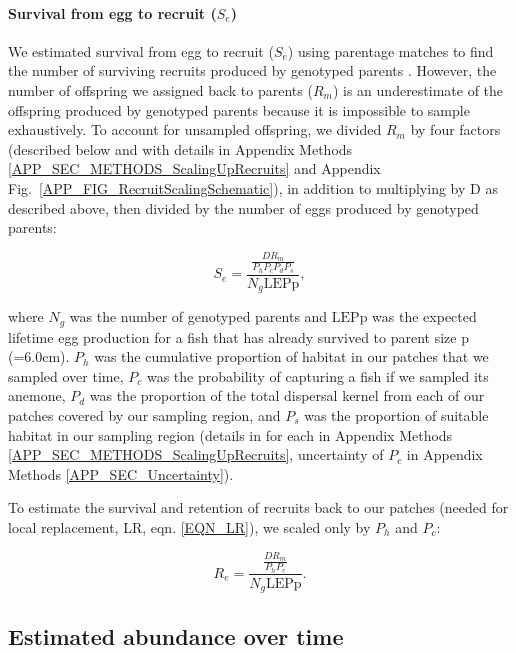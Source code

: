 \documentclass[12pt, oneside]{article}   	%
\begin{document}
\paragraph*{Survival from egg to recruit ($S_e$)}

We estimated survival from egg to recruit ($S_e$) using parentage matches to find the number of surviving recruits produced by genotyped parents \citep[similar to][]{johnson2018integrating}. However, the number of offspring we assigned back to parents ($R_m$) is an underestimate of the offspring produced by genotyped parents because it is impossible to sample exhaustively. To account for unsampled offspring, we divided $R_m$ by four factors (described below and with details in Appendix Methods \ref{APP_SEC_METHODS_ScalingUpRecruits} and Appendix Fig.\ \ref{APP_FIG_RecruitScalingSchematic}), in addition to multiplying by $\text{D}$ as described above, then divided by the number of eggs produced by genotyped parents:

\begin{equation}
S_e = \frac{\frac{D R_m}{P_h P_c P_d P_s}}{N_g \text{LEPp}}, \label{EQN_EggRecruitSurv}
\end{equation}

where $N_g$ was the number of genotyped parents and $\text{LEPp}$ was the expected lifetime egg production for a fish that has already survived to parent size p (=6.0cm). $P_h$ was the cumulative proportion of habitat in our patches that we sampled over time, $P_c$ was the probability of capturing a fish if we sampled its anemone, $P_d$ was the proportion of the total dispersal kernel from each of our patches covered by our sampling region, and $P_s$ was the proportion of suitable habitat in our sampling region (details in for each in Appendix Methods \ref{APP_SEC_METHODS_ScalingUpRecruits}, uncertainty of $P_c$ in Appendix Methods \ref{APP_SEC_Uncertainty}).

To estimate the survival and retention of recruits back to our patches (needed for local replacement, LR, eqn. \ref{EQN_LR}), we scaled only by $P_h$ and $P_c$: 

\begin{equation}
R_e = \frac{\frac{D R_m}{P_h P_c}}{N_g \text{LEPp}}. \label{EQN_Re}
\end{equation}

\subsection*{Estimated abundance over time} 
\end{document}
